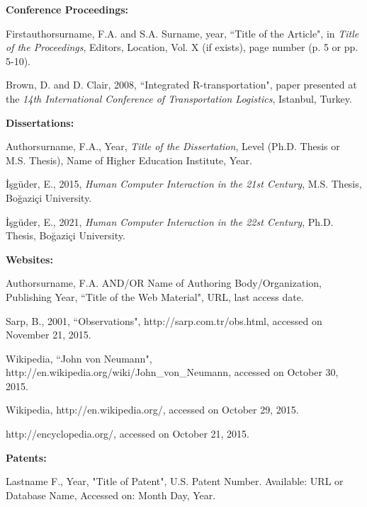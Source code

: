 \documentclass[a4paper,oneside,12pt]{report}
\numberwithin{equation}{chapter}
\begin{document}
\clearpage
\leftskip 5mm \parindent -5mm \textbf{Conference Proceedings:}

\leftskip 5mm \parindent -5mm Firstauthorsurname, F.A. and S.A. Surname, year, ``Title of the Article", in \textit{Title of the Proceedings}, Editors, Location, Vol. X (if exists), page number (p. 5 or pp. 5-10).

\leftskip 5mm \parindent -5mm Brown, D. and D. Clair, 2008, ``Integrated R-transportation", paper presented at the \textit{14th International Conference of Transportation Logistics}, Istanbul, Turkey.\newline 


\leftskip 5mm \parindent -5mm \textbf{Dissertations:}

\leftskip 5mm \parindent -5mm Authorsurname, F.A., Year, \textit{Title of the Dissertation}, Level (Ph.D. Thesis or M.S. Thesis), Name of Higher Education Institute, Year.

\leftskip 5mm \parindent -5mm İşgüder, E., 2015, \textit{Human Computer Interaction in the 21st Century}, M.S. Thesis, Boğaziçi University.

\leftskip 5mm \parindent -5mm İşgüder, E., 2021, \textit{Human Computer Interaction in the 22st Century}, Ph.D. Thesis, Boğaziçi University.\newline


\leftskip 5mm \parindent -5mm \textbf{Websites:}

\leftskip 5mm \parindent -5mm Authorsurname, F.A. AND/OR Name of Authoring Body/Organization, Publishing Year, ``Title of the Web Material", URL, last access date.

\leftskip 5mm \parindent -5mm Sarp, B., 2001, ``Observations", http://sarp.com.tr/obs.html, accessed on November 21, 2015.

\clearpage
\leftskip 5mm \parindent -5mm Wikipedia, ``John von Neumann", http://en.wikipedia.org/wiki/John\_von\_Neumann, accessed on October 30, 2015.

\leftskip 5mm \parindent -5mm Wikipedia, http://en.wikipedia.org/, accessed on October 29, 2015.

\leftskip 5mm \parindent -5mm http://encyclopedia.org/, accessed on October 21, 2015.\newline


\leftskip 5mm \parindent -5mm \textbf{Patents:}

\leftskip 5mm \parindent -5mm Lastname F., Year, "Title of Patent", U.S. Patent Number. Available: URL or Database Name, Accessed on: Month Day, Year.
\end{document}
